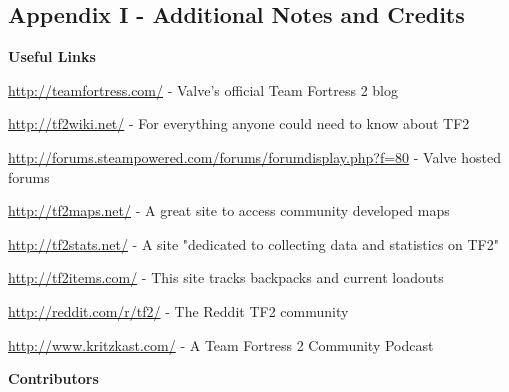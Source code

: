\subsection{Appendix I - Additional Notes and Credits}
\newenvironment{packed_item}{
\begin{itemize}
  \setlength{\itemsep}{1pt}
  \setlength{\parskip}{0pt}
  \setlength{\parsep}{0pt}
}{\end{itemize}}


{\bf Useful Links}

\url{http://teamfortress.com/} - Valve's official Team Fortress 2 blog

\url{http://tf2wiki.net/} - For everything anyone could need to know about TF2

\url{http://forums.steampowered.com/forums/forumdisplay.php?f=80} - Valve hosted forums 

\url{http://tf2maps.net/} - A great site to access community developed maps

\url{http://tf2stats.net/} - A site "dedicated to collecting data and statistics on TF2"

\url{http://tf2items.com/} - This site tracks backpacks and current loadouts

\url{http://reddit.com/r/tf2/} - The Reddit TF2 community

\url{http://www.kritzkast.com/} - A Team Fortress 2 Community Podcast


\vspace{40 mm}


{\bf Contributors}

